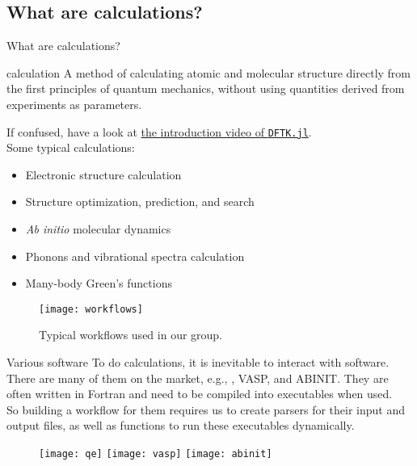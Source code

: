 \subsection{What are \ab{} calculations?}

\begin{frame}[allowframebreaks]{What are \ab{} calculations?}
    \begin{definitionblock}{\ab{} calculation}
        A method of calculating atomic and molecular structure directly from the first
        principles of quantum mechanics, without using quantities derived from experiments
        as parameters.
    \end{definitionblock}

    If confused, have a look at \href{https://youtu.be/-RomkxjlIcQ}{the introduction video of \texttt{DFTK.jl}}.\\

    Some typical \ab{} calculations:
    \begin{itemize}
        \item Electronic structure calculation
        \item Structure optimization, prediction, and search
        \item \textit{Ab initio} molecular dynamics
        \item Phonons and vibrational spectra calculation
        \item Many-body Green's functions
    \end{itemize}

    \framebreak

    \begin{figure}[H]
        \centering
        \texttt{[image: workflows]}
        \caption{Typical \ab{} workflows used in our group.}
        \label{eq:workflows}
    \end{figure}
\end{frame}

\begin{frame}{Various \ab{} software}
    To do \ab{} calculations, it is inevitable to interact with \ab{} software.
    There are many of them on the market, e.g., \qe{}, VASP, and ABINIT.
    They are often written in Fortran and need to be compiled into executables
    when used.\\

    So building a workflow for them requires us to create parsers for their input and output
    files, as well as functions to run these executables dynamically.

    \begin{figure}[b]
        \centering
        \texttt{[image: qe]}
        \hfill
        \texttt{[image: vasp]}
        \hfill
        \texttt{[image: abinit]}
        \label{fig:abinitsoftware}
    \end{figure}
\end{frame}

